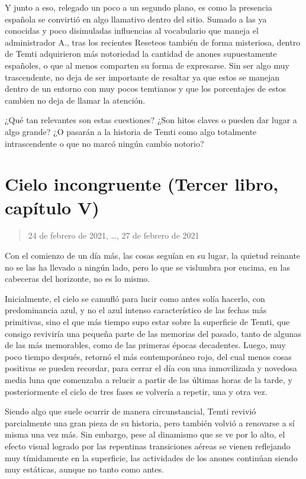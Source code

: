 \documentclass[
]{book}
\begin{document}
Y junto a eso, relegado un poco a un segundo plano, es como la presencia española se convirtió en algo llamativo dentro del sitio. Sumado a las ya conocidas y poco disimuladas influencias al vocabulario que maneja el administrador A., tras los recientes Reseteos también de forma misteriosa, dentro de Temti adquirieron más notoriedad la cantidad de anones supuestamente españoles, o que al menos comparten su forma de expresarse. Sin ser algo muy trascendente, no deja de ser importante de resaltar ya que estos se manejan dentro de un entorno con muy pocos temtianos y que los porcentajes de estos cambien no deja de llamar la atención.

¿Qué tan relevantes son estas cuestiones? ¿Son hitos claves o pueden dar lugar a algo grande? ¿O pasarán a la historia de Temti como algo totalmente intrascendente o que no marcó ningún cambio notorio?

\hypertarget{cielo-incongruente-tercer-libro-capuxedtulo-v}{%
\section{Cielo incongruente (Tercer libro, capítulo V)}\label{cielo-incongruente-tercer-libro-capuxedtulo-v}}

\begin{quote}
24 de febrero de 2021, \ldots, 27 de febrero de 2021
\end{quote}

Con el comienzo de un día más, las cosas seguían en su lugar, la quietud reinante no se las ha llevado a ningún lado, pero lo que se vislumbra por encima, en las cabeceras del horizonte, no es lo mismo.

Inicialmente, el cielo se camufló para lucir como antes solía hacerlo, con predominancia azul, y no el azul intenso característico de las fechas más primitivas, sino el que más tiempo supo estar sobre la superficie de Temti, que consigo reviviría una pequeña parte de las memorias del pasado, tanto de algunas de las más memorables, como de las primeras épocas decadentes. Luego, muy poco tiempo después, retornó el más contemporáneo rojo, del cual menos cosas positivas se pueden recordar, para cerrar el día con una inmovilizada y novedosa media luna que comenzaba a relucir a partir de las últimas horas de la tarde, y posteriormente el ciclo de tres fases se volvería a repetir, una y otra vez.

Siendo algo que suele ocurrir de manera circunstancial, Temti revivió parcialmente una gran pieza de su historia, pero también volvió a renovarse a sí misma una vez más. Sin embargo, pese al dinamismo que se ve por lo alto, el efecto visual logrado por las repentinas transiciones aéreas se vienen reflejando muy tímidamente en la superficie, las actividades de los anones continúan siendo muy estáticas, aunque no tanto como antes.
\end{document}

